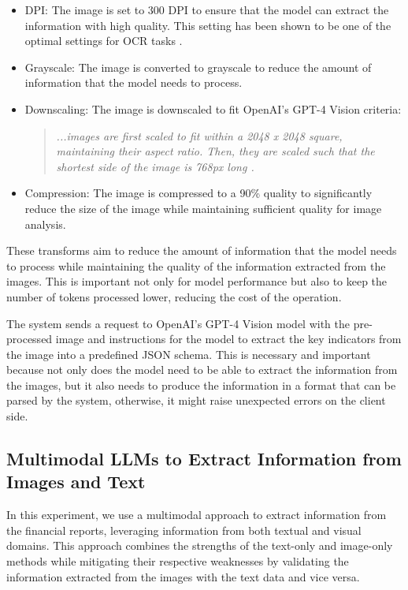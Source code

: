 \documentclass[english, 12pt, a4paper, elec, utf8, a-2b, online]{aaltothesis}
\begin{document}
\begin{itemize}
\label{list:image_transforms}
    \item \ac{DPI}: The image is set to 300 \ac{DPI} to ensure that the model can extract the information with high quality.
    This setting has been shown to be one of the optimal settings for \ac{OCR} tasks \cite{ocr_preprocessing2007}.
    \item Grayscale: The image is converted to grayscale to reduce the amount of information that the model needs to process.
    \item Downscaling: The image is downscaled to fit OpenAI's \ac{GPT}-4 Vision criteria:
    \begin{quote}
        \textit{...images are first scaled to fit within a 2048 x 2048 square, maintaining their aspect ratio. Then, they are scaled such that the shortest side of the image is 768px long \cite{OpenAIVisionAPI}.}
    \end{quote}
    \item Compression: The image is compressed to a 90\% quality to significantly reduce the size of the image while maintaining sufficient quality for image analysis.
\end{itemize}

These transforms aim to reduce the amount of information that the model needs to process while maintaining the quality of the information extracted from the images.
This is important not only for model performance but also to keep the number of tokens processed lower, reducing the cost of the operation.

The system sends a request to OpenAI's \ac{GPT}-4 Vision model with the pre-processed image and instructions for the model to extract the key indicators from the image into a predefined JSON schema.
This is necessary and important because not only does the model need to be able to extract the information from the images, but it also needs to produce the information in a format that can be parsed by the system, otherwise, it might raise unexpected errors on the client side.

\subsection{Multimodal LLMs to Extract Information from Images and Text}

In this experiment, we use a multimodal approach to extract information from the financial reports, leveraging information from both textual and visual domains.
This approach combines the strengths of the text-only and image-only methods while mitigating their respective weaknesses by validating the information extracted from the images with the text data and vice versa.
\end{document}
